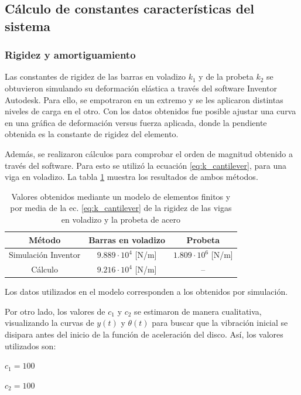 \subsection{Cálculo de constantes características del sistema}
 
\subsubsection{Rigidez y amortiguamiento} Las constantes de rigidez de las barras en voladizo $k_1$ y de la probeta $k_2$ se obtuvieron simulando su deformación elástica a través del software Inventor Autodesk. Para ello, se empotraron en un extremo y se les aplicaron distintas niveles de carga en el otro. Con los datos obtenidos fue posible ajustar una curva en una gráfica de deformación versus fuerza aplicada, donde la pendiente obtenida es la constante de rigidez del elemento. 

Además, se realizaron cálculos para comprobar el orden de magnitud obtenido a través del software. Para esto se utilizó la ecuación \ref{eq:k_cantilever}, para una viga en voladizo. La tabla \ref{tab:k_valor} muestra los resultados de ambos métodos.
\begin{table}[h]
\centering
\begin{tabular}{ccc}
\hline
Método & Barras en voladizo & Probeta \\ \hline
Simulación Inventor & $9.889\cdot 10^4$ [N/m] & $1.809\cdot 10^6$ [N/m] \\
Cálculo & $9.216\cdot 10^4$ [N/m] & -- \\ \hline
\end{tabular}
\caption{Valores obtenidos mediante un modelo de elementos finitos y por media de la ec. \ref{eq:k_cantilever} de la rigidez de las vigas en voladizo y la probeta de acero}
\label{tab:k_valor}
\end{table}
Los datos utilizados en el modelo corresponden a los obtenidos por simulación.

Por otro lado, los valores de $c_1$ y $c_2$ se estimaron de manera cualitativa, visualizando la curvas de $y(t)$ y $\theta(t)$ para buscar que la vibración inicial se disipara antes del inicio de la función de aceleración del disco. Así, los valores utilizados son:
\begin{itemize*}
	\item $c_1= 100$
	\item $c_2= 100$ 
\end{itemize*}

